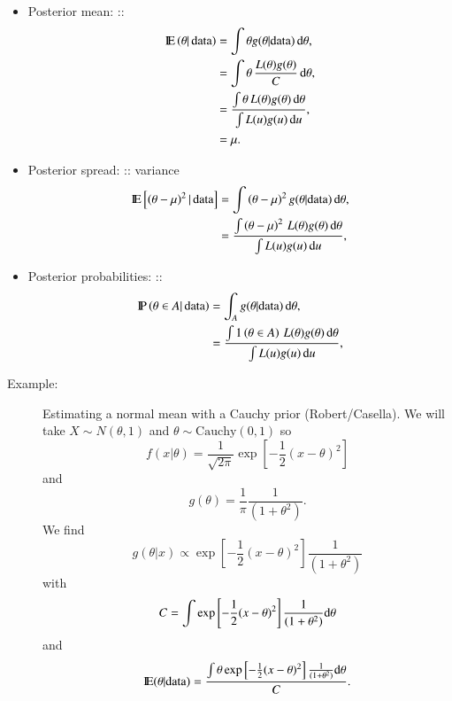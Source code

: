 \documentclass[captions=tableheading]{scrbook}
\begin{document}
\begin{itemize}
\item Posterior mean: ::
   \begin{align*}
   \mathrm{I\hspace{-1.5pt}E} \left( \theta |\, \mbox{data}  \right) & = \int \theta g( \theta | \mbox{data} ) \, \mathrm{d} \theta, \\
   & = \int \theta \, \frac{L(\theta)g(\theta)}{C} \, \mathrm{d} \theta, \\
   & = \frac{\int \theta \, L(\theta)g(\theta) \, \mathrm{d} \theta}{\int L(u)g(u) \, \mathrm{d} u}, \\
   & = \mu.
   \end{align*}
\item Posterior spread: :: variance
   \begin{align*}
   \mathrm{I\hspace{-1.5pt}E} \left[ \left(\theta - \mu \right)^{2} |\, \mbox{data}  \right] & = \int \left(\theta - \mu \right)^{2} g( \theta | \mbox{data} ) \, \mathrm{d} \theta, \\
   & = \frac{\int \left(\theta - \mu \right)^{2} \, L(\theta)g(\theta) \, \mathrm{d} \theta}{\int L(u)g(u) \, \mathrm{d} u}, \\
   \end{align*}
\item Posterior probabilities: :: 
   \begin{align*}
   \mathrm{I\hspace{-1.5pt}P}\left( \theta \in A |\,\mbox{data} \right) & = \int_{A}  g( \theta | \mbox{data} ) \, \mathrm{d} \theta, \\
   & = \frac{\int 1\left(\theta \in A \right) \, L(\theta)g(\theta) \, \mathrm{d} \theta}{\int L(u)g(u) \, \mathrm{d} u}, \\
   \end{align*}
\end{itemize}


\begin{description}
\item[Example:] Estimating a normal mean with a Cauchy prior (Robert/Casella).
  We will take \( X \sim N(\theta,1) \)  and \( \theta \sim \mathrm{Cauchy}(0,1) \) so 
  \[
  f(x|\theta) = \frac{1}{\sqrt{2\pi}}\exp \left[-\frac{1}{2}(x - \theta)^2  \right]
  \]
  and
  \[
  g(\theta) = \frac{1}{\pi}\frac{1}{(1 + \theta^{2})}.
  \]
  We find
  \[
  g(\theta|x) \propto \exp \left[-\frac{1}{2}(x - \theta)^2  \right] \frac{1}{(1 + \theta^{2})}
  \]
  with
  \[
  C = \int \exp \left[-\frac{1}{2}(x - \theta)^2  \right] \frac{1}{(1 + \theta^{2})} \mathrm{d} \theta
  \]
  and
  \[
  \mathrm{I\hspace{-1.5pt}E} (\theta | \mbox{data}) = \frac{ \int \theta \exp \left[-\frac{1}{2}(x - \theta)^2  \right] \frac{1}{(1 + \theta^{2})} \mathrm{d} \theta }{C}.
  \]
\end{description}
\end{document}
